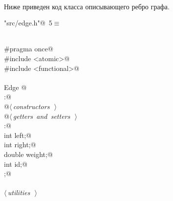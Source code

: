 \documentclass[12pt]{article}
\begin{document}
\paragraph{}
Ниже приведен код класса описывающего ребро графа.
\begin{flushleft} \small
\begin{minipage}{\linewidth}\label{scrap1}\raggedright\small
{} \verb@"src/edge.h"@\nobreak\ {\footnotesize {5}}$\equiv$
\vspace{-1ex}
\begin{list}{}{} \item
\mbox{}\verb@@\\
\mbox{}\verb@#pragma once@\\
\mbox{}\verb@#include <atomic>@\\
\mbox{}\verb@#include <functional>@\\
\mbox{}\verb@@\\
\mbox{}\verb@class Edge {@\\
\mbox{}\verb@public:@\\
\mbox{}\verb@    @\hbox{$\langle\,${\itshape constructors}\nobreak\ {\footnotesize {}}$\,\rangle$}\verb@@\\
\mbox{}\verb@    @\hbox{$\langle\,${\itshape getters and setters}\nobreak\ {\footnotesize {}}$\,\rangle$}\verb@@\\
\mbox{}\verb@private:@\\
\mbox{}\verb@    int left;@\\
\mbox{}\verb@    int right;@\\
\mbox{}\verb@    double weight;@\\
\mbox{}\verb@    int id;@\\
\mbox{}\verb@};@\\
\mbox{}\verb@@\\
\mbox{}\verb@@\hbox{$\langle\,${\itshape utilities}\nobreak\ {\footnotesize {}}$\,\rangle$}\verb@@\\
\mbox{}\verb@@\\
\mbox{}\verb@@{\NWsep}
\end{list}
\vspace{-1.5ex}
\footnotesize
\begin{list}{}{\setlength{\itemsep}{-\parsep}\setlength{\itemindent}{-\leftmargin}}

\item{}
\end{list}
\end{minipage}\vspace{4ex}
\end{flushleft}
\end{document}
